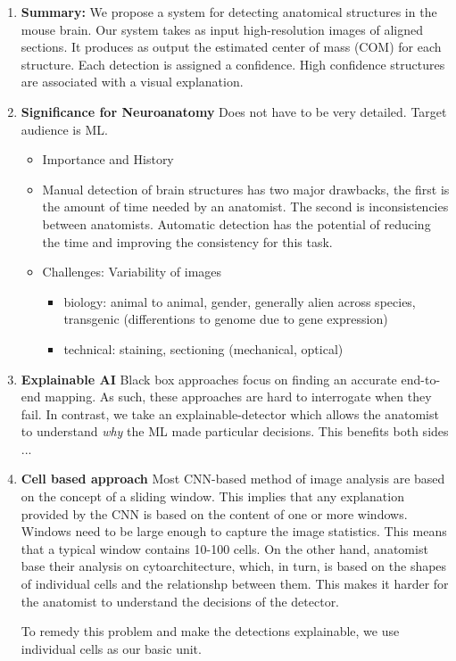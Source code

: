 \documentclass[runningheads]{llncs}
\begin{document}
\begin{enumerate}
\item {\bf Summary:} We propose a system for detecting anatomical structures in the mouse brain. Our system takes as input high-resolution images of aligned sections. It produces as output the estimated center of mass (COM) for each structure. Each detection is assigned a confidence. High confidence structures are associated with a visual explanation.
\item {\bf Significance for Neuroanatomy}
Does not have to be very detailed. Target audience is ML.
\begin{itemize}
\item Importance and History
\item Manual detection of brain structures has two major drawbacks, the first is the amount of time needed by an anatomist. The second is inconsistencies between anatomists. Automatic detection has the potential of reducing the time and improving the consistency for this task.
\item Challenges: Variability of images
    \begin{itemize}
        \item biology: animal to animal, gender, generally alien across species, transgenic (differentions to genome due to gene expression)
        \item technical: staining, sectioning (mechanical, optical)
    \end{itemize}
\end{itemize}
\item {\bf Explainable AI} Black box approaches focus on finding an accurate end-to-end mapping. As such, these approaches are hard to interrogate when they fail. In contrast, we take an explainable-detector which allows the anatomist to understand {\em why} the ML made particular decisions. This benefits both sides ...

\item{\bf Cell based approach}  Most CNN-based method of image analysis are based on the concept of a sliding window. This implies that any explanation provided by the CNN is based on the content of one or more windows. Windows need to be large enough to capture the image statistics. This means that a typical window contains 10-100 cells.
On the other hand, anatomist base their analysis on cytoarchitecture, which, in turn, is based on the shapes of individual cells and the relationshp between them. This makes it harder for the anatomist to understand the decisions of the detector.

To remedy this problem and make the detections explainable, we use individual cells as our basic unit. 
\end{enumerate}
\end{document}
